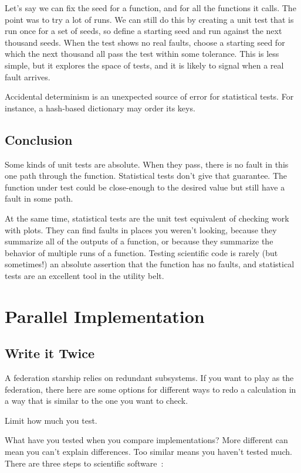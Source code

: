 \documentclass[fleqn,10pt]{olplainarticle}
\begin{document}
Let's say we can fix the seed for a function, and for all the
functions it calls. The point was to try a lot of runs. We
can still do this by creating a unit test that is run once
for a set of seeds, so define a starting seed and run against
the next thousand seeds. When the test shows no real faults,
choose a starting seed for which the next thousand all pass
the test within some tolerance. This is less simple, but it
explores the space of tests, and it is likely to signal when
a real fault arrives.

Accidental determinism is an unexpected source of error for
statistical tests. For instance, a hash-based dictionary may
order its keys.

\subsection{Conclusion}

Some kinds of unit tests are absolute. When they pass,
there is no fault in this one path through the function.
Statistical tests don't give that guarantee. The function
under test could be close-enough to the desired value but
still have a fault in some path.

At the same time, statistical tests are the unit test
equivalent of checking work with plots. They can find faults
in places you weren't looking, because they summarize all
of the outputs of a function, or because they summarize
the behavior of multiple runs of a function. Testing scientific
code is rarely (but sometimes!) an absolute assertion that
the function has no faults, and statistical tests are an
excellent tool in the utility belt.


\section{Parallel Implementation}\label{sec:parallel-implementation}
\subsection{Write it Twice}
A federation starship relies on redundant subsystems. If you want to play
as the federation, there here are some options for different ways to
redo a calculation in a way that is similar to the one you want to check.

Limit how much you test.

What have you tested when you compare implementations?
More different can mean you can't explain differences.
Too similar means you haven't tested much.
There are three steps to scientific software~\citep{dahlgren2005}:
\end{document}
